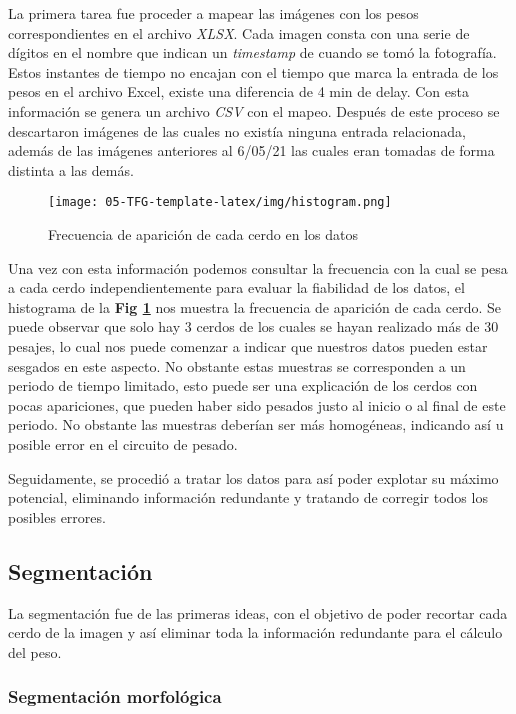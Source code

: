 ﻿\documentclass[10pt,a4paper,twocolumn,twoside]{article}
\begin{document}
La primera tarea fue proceder a mapear las imágenes con los pesos correspondientes en el archivo \textit{XLSX}. Cada imagen consta con una serie de dígitos en el nombre que indican un \textit{timestamp} de cuando se tomó la fotografía. Estos instantes de tiempo no encajan con el tiempo que marca la entrada de los pesos en el archivo Excel, existe una diferencia de 4 min de delay. Con esta información se genera un archivo \textit{CSV} con el mapeo.
Después de este proceso se descartaron imágenes de las cuales no existía ninguna entrada relacionada, además de las imágenes anteriores al 6/05/21 las cuales eran tomadas de forma distinta a las demás.

\begin{figure}[!htb]
\centering
\texttt{[image: 05-TFG-template-latex/img/histogram.png]}
\caption{Frecuencia de aparición de cada cerdo en los datos}
\label{hist}
\end{figure}

Una vez con esta información podemos consultar la frecuencia con la cual se pesa a cada cerdo independientemente para evaluar la fiabilidad de los datos, el histograma de la \textbf{Fig \ref{hist}} nos muestra la frecuencia de aparición de cada cerdo. Se puede observar que solo hay 3 cerdos de los cuales se hayan realizado más de 30 pesajes, lo cual nos puede comenzar a indicar que nuestros datos pueden estar sesgados en este aspecto. 
No obstante estas muestras se corresponden a un periodo de tiempo limitado, esto puede ser una explicación de los cerdos con pocas apariciones, que pueden haber sido pesados justo al inicio o al final de este periodo. No obstante las muestras deberían ser más homogéneas, indicando así u posible error en el circuito de pesado.

Seguidamente, se procedió a tratar los datos para así poder explotar su máximo potencial, eliminando información redundante y tratando de corregir todos los posibles errores.

\subsection{Segmentación}
La segmentación fue de las primeras ideas, con el objetivo de poder recortar cada cerdo de la imagen y así eliminar toda la información redundante para el cálculo del peso.

\subsubsection{Segmentación morfológica}
\end{document}
